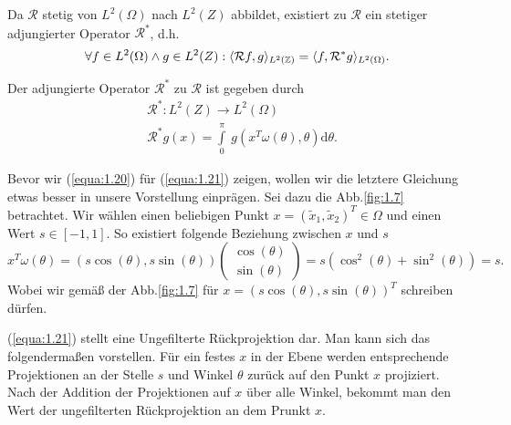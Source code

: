 Da $\mathcal{R}$ stetig von $L^2(\Omega)$ nach $L^2(Z)$	abbildet, existiert zu $\mathcal{R}$ ein stetiger adjungierter Operator $\mathcal{R^*}$, d.h.
\begin{equation}
	\forall f \in L^2(\Omega) \wedge g \in L^2(Z) : \langle \mathcal{R}f, g \rangle_{L^2(\mathbb{Z})} = \langle f, \mathcal{R^*}g \rangle_{L^2(\Omega)}.
	\label{equa:1.20}
\end{equation}
\begin{lemma}
	Der adjungierte Operator $\mathcal{R^*}$ zu $\mathcal{R}$ ist gegeben durch
	\begin{equation}
		\begin{split}
			& \mathcal{R^*} : L^2(Z) \rightarrow L^2(\Omega)\\
			& \mathcal{R^*} g(x) = \int\limits_{0}^{\pi} \ g(x^{T}\omega(\theta),\theta) \mbox{d}\theta.
		\end{split}
		\label{equa:1.21}
	\end{equation}
	\label{lemma:2}
\end{lemma}
\begin{Bemerkung}
	Bevor wir (\ref{equa:1.20}) für (\ref{equa:1.21}) zeigen, wollen wir die letztere Gleichung etwas besser in unsere Vorstellung einprägen. Sei dazu die Abb.\ref{fig:1.7} betrachtet. Wir wählen einen beliebigen Punkt $x = (\tilde{x}_1, \tilde{x}_2)^{T} \in \Omega$ und einen Wert $s \in [-1,1]$. So existiert folgende Beziehung zwischen $x$ und $s$
	\begin{equation}
		x^{T}\omega(\theta) = (s\cos(\theta), s\sin(\theta))\left( \begin{matrix} \cos(\theta) \\ \sin(\theta) \end{matrix}\right) = s(\cos^2(\theta) + \sin^2(\theta)) = s.
		\label{equa:1.22}
	\end{equation}
	Wobei wir gemäß der Abb.\ref{fig:1.7} für $x = (s\cos(\theta), s\sin(\theta))^T$ schreiben dürfen.
	
	(\ref{equa:1.21}) stellt eine Ungefilterte Rückprojektion dar. Man kann sich das folgendermaßen vorstellen. Für ein festes $x$ in der Ebene werden entsprechende Projektionen an der Stelle $s$ und Winkel $\theta$ zurück auf den Punkt $x$ projiziert. Nach der Addition der Projektionen auf $x$ über alle Winkel, bekommt man den Wert der ungefilterten Rückprojektion an dem Prunkt $x$.
	\label{bem:3}
\end{Bemerkung}
